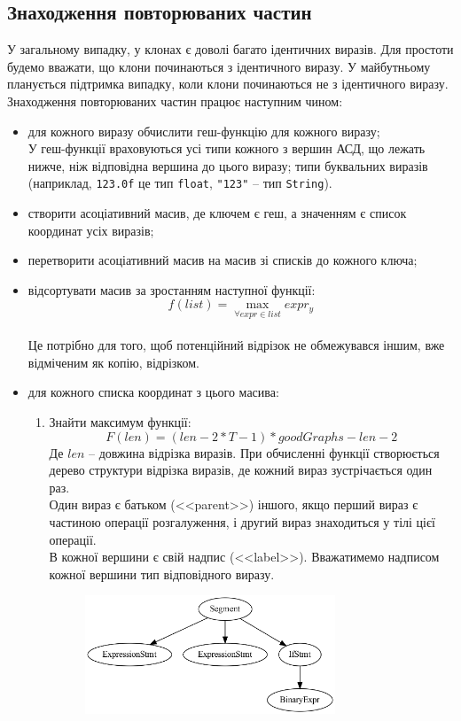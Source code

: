 \documentclass[a4paper, 14pt]{article}
\begin{document}
\subsection{Знаходження повторюваних частин}
У загальному випадку, у клонах є доволі багато ідентичних виразів. Для простоти будемо вважати, що клони починаються з ідентичного виразу. У майбутньому планується підтримка випадку, коли клони починаються не з ідентичного виразу. \\
Знаходження повторюваних частин працює наступним чином:
\begin{itemize}
\item для кожного виразу обчислити геш-функцію для кожного виразу;\\
У геш-функції враховуються усі типи кожного з вершин АСД, що лежать нижче, ніж відповідна вершина до цього виразу; типи буквальних виразів (наприклад, \verb|123.0f| це тип \verb|float|, \verb|"123"| -- тип \verb|String|).
\item{створити асоціативний масив, де ключем є геш, а значенням є список координат усіх виразів;}
\item{перетворити асоціативний масив на масив зі списків до кожного ключа;}
\item{відсортувати масив за зростанням наступної функції: $$f(list)=\max_{\forall expr \in list}{expr_{y}} $$ \\
Це потрібно для того, щоб потенційний відрізок не обмежувався іншим, вже відміченим як копію, відрізком.}
\item{для кожного списка координат з цього масива: 
\begin{enumerate}
\item{Знайти максимум функції: $$F(len)=(len-2*T-1)*goodGraphs-len-2$$
Де $len$ -- довжина відрізка виразів. При обчисленні функції створюється дерево структури відрізка виразів, де кожний вираз зустрічається один раз. \\
Один вираз є батьком (<<parent>>) іншого, якщо перший вираз є частиною операції розгалуження, і другий вираз знаходиться у тілі цієї операції. \\
В кожної вершини є свій надпис (<<label>>). Вважатимемо надписом кожної вершини тип відповідного виразу. \\
\begin{figure}[h]
    \centering
    \includegraphics[width=0.75\textwidth]{function_graph_example}

\end{figure}}
\end{enumerate}}
\end{itemize}
\end{document}
